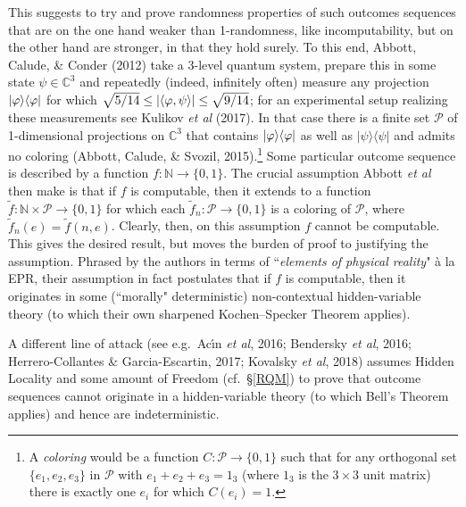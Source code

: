 \documentclass[12pt]{article}
\numberwithin{equation}{section}
\newcommand{\til}{\tilde}
\newcommand{\raw}{\rightarrow}
\newcommand{\la}{\langle} \newcommand{\ra}{\rangle}
\newcommand{\x}{\times}
\newcommand{\C}{{\mathbb C}}
\newcommand{\N}{{\mathbb N}} \newcommand{\R}{{\mathbb R}}
\begin{document}
This suggests to try and prove randomness properties of such outcomes sequences that are on the one hand weaker than 1-randomness, like incomputability, but on the other hand are stronger, in that they hold surely. 
To this end, Abbott,  Calude, \&  Conder (2012)  take a 3-level quantum system, prepare this in some state $\psi\in\C^3$ and repeatedly (indeed, infinitely often) measure any projection $|\phv\ra\la\phv|$ for which $\sqrt{5/14}\leq |\la\phv,\psi\ra|\leq\sqrt{9/14}$; for an experimental setup realizing these measurements see Kulikov \emph{et al} (2017). In that case there is a finite set $\mathcal{P}$ of 1-dimensional projections on $\C^3$ that contains $|\phv\ra\la\phv|$ as well as $|\psi\ra\la\psi|$ and admits no coloring (Abbott,  Calude, \& Svozil, 2015).\footnote{\label{colorfn}
A \emph{coloring} would be a function $C:\mathcal{P}\raw \{0,1\}$ such that for any orthogonal set $\{e_1,e_2,e_3\}$ in  $\mathcal{P}$ with
$e_1+e_2+e_3=1_3$ (where $1_3$ is the $3\x 3$ unit matrix) there is exactly one  $e_i$ for which $C(e_i)=1$. } Some particular outcome sequence is described by a function $f:\N\raw\{0,1\}$.
The crucial assumption  Abbott \emph{et al} then make is that if $f$ is computable, then it extends to a function
$\til{f}: \N\x\mathcal{P}\raw\{0,1\}$ for which each $\til{f}_n: \mathcal{P}\raw\{0,1\}$ is a coloring of $\mathcal{P}$, where $\til{f}_n(e)=\til{f}(n,e)$. Clearly, then, on this assumption $f$ cannot be computable. This gives the desired result, but  moves the burden of proof to justifying the assumption. Phrased by the authors in terms of ``\emph{elements of physical reality}" \`{a} la EPR, their assumption in fact postulates that if $f$ is computable, then it originates in some (``morally" deterministic) non-contextual hidden-variable theory (to which their own sharpened Kochen--Specker Theorem applies).

A different line of attack  (see e.g.\ Ac\'{\i}n  \emph{et al}, 2016; Bendersky  \emph{et al}, 2016;  Herrero-Collantes \& Garcia-Escartin, 2017;  Kovalsky \emph{et al}, 2018)
assumes Hidden Locality and some amount of Freedom (cf.\ \S\ref{RQM}) to prove that 
 outcome sequences cannot originate in a hidden-variable theory  (to which Bell's Theorem applies) and hence are indeterministic. 
\end{document}
